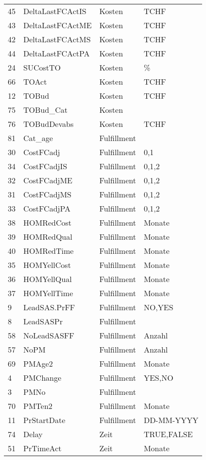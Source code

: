 \begin{longtable}[ht]{p{} p{} p{} p{}}
	45    & DeltaLastFCActIS & Kosten & TCHF \\
	43    & DeltaLastFCActME & Kosten & TCHF \\
	42    & DeltaLastFCActMS & Kosten & TCHF \\
	44    & DeltaLastFCActPA & Kosten & TCHF \\
	24    & SUCostTO & Kosten & \% \\
	66    & TOAct & Kosten & TCHF \\
	12    & TOBud & Kosten & TCHF \\
	75    & TOBud\_Cat & Kosten &  \\
	76    & TOBudDevabs & Kosten & TCHF \\
	81    & Cat\_age & Fulfillment &  \\
	30    & CostFCadj & Fulfillment & {0,1} \\
	34    & CostFCadjIS & Fulfillment & {0,1,2} \\
	32    & CostFCadjME & Fulfillment & {0,1,2} \\
	31    & CostFCadjMS & Fulfillment & {0,1,2} \\
	33    & CostFCadjPA & Fulfillment & {0,1,2} \\
	38    & HOMRedCost & Fulfillment & Monate \\
	39    & HOMRedQual & Fulfillment & Monate \\
	40    & HOMRedTime & Fulfillment & Monate \\
	35    & HOMYellCost & Fulfillment & Monate \\
	36    & HOMYellQual & Fulfillment & Monate \\
	37    & HOMYellTime & Fulfillment & Monate \\
	9     & LeadSAS.PrFF & Fulfillment & {NO,YES} \\
	8     & LeadSASPr & Fulfillment &  \\
	58    & NoLeadSASFF & Fulfillment & Anzahl \\
	57    & NoPM  & Fulfillment & Anzahl \\
	69    & PMAge2 & Fulfillment & Monate \\
	4     & PMChange & Fulfillment & {YES,NO} \\
	3     & PMNo  & Fulfillment &  \\
	70    & PMTen2 & Fulfillment & Monate \\
	11    & PrStartDate & Fulfillment & DD-MM-YYYY \\
	74    & Delay & Zeit  & {TRUE,FALSE} \\
	51    & PrTimeAct & Zeit  & Monate \\

\end{longtable}
